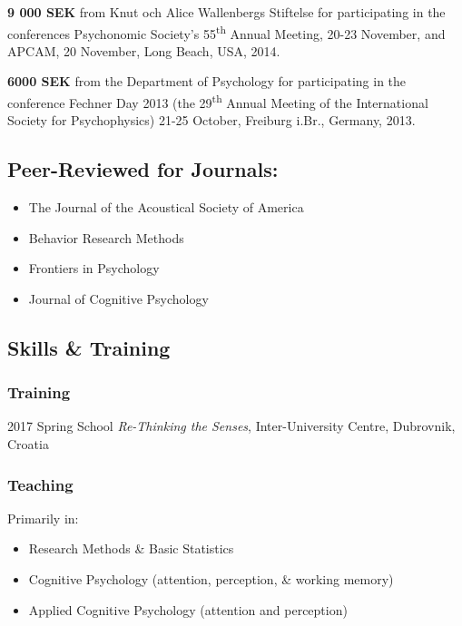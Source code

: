 \documentclass[]{article}
\providecommand{\tightlist}{%
  \setlength{\itemsep}{0pt}\setlength{\parskip}{0pt}}
\begin{document}
\textbf{9 000 SEK} from Knut och Alice Wallenbergs Stiftelse for
participating in the conferences Psychonomic Society's
55\textsuperscript{th} Annual Meeting, 20-23 November, and APCAM, 20
November, Long Beach, USA, 2014.

\textbf{6000 SEK} from the Department of Psychology for participating in
the conference Fechner Day 2013 (the 29\textsuperscript{th} Annual
Meeting of the International Society for Psychophysics) 21-25 October,
Freiburg i.Br., Germany, 2013.

\hypertarget{peer-reviewed-for-journals}{%
\subsection{Peer-Reviewed for
Journals:}\label{peer-reviewed-for-journals}}

\begin{itemize}
\item
  The Journal of the Acoustical Society of America
\item
  Behavior Research Methods
\item
  Frontiers in Psychology
\item
  Journal of Cognitive Psychology
\end{itemize}

\hypertarget{skills-training}{%
\subsection{Skills \& Training}\label{skills-training}}

\hypertarget{training}{%
\subsubsection{Training}\label{training}}

2017 Spring School \emph{Re-Thinking the Senses}, Inter-University
Centre, Dubrovnik, Croatia

\hypertarget{teaching}{%
\subsubsection{Teaching}\label{teaching}}

Primarily in:

\begin{itemize}
\tightlist
\item
  Research Methods \& Basic Statistics
\item
  Cognitive Psychology (attention, perception, \& working memory)
\item
  Applied Cognitive Psychology (attention and perception)
\end{itemize}
\end{document}
